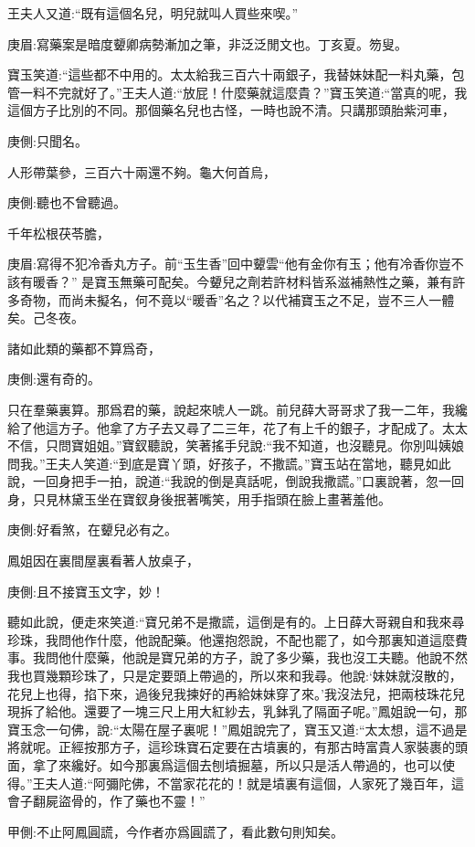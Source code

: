 \begin{parag}
    王夫人又道:“既有這個名兒，明兒就叫人買些來喫。”\begin{note}庚眉:寫藥案是暗度顰卿病勢漸加之筆，非泛泛閒文也。丁亥夏。笏叟。\end{note}寶玉笑道:“這些都不中用的。太太給我三百六十兩銀子，我替妹妹配一料丸藥，包管一料不完就好了。”王夫人道:“放屁！什麼藥就這麼貴？”寶玉笑道:“當真的呢，我這個方子比別的不同。那個藥名兒也古怪，一時也說不清。只講那頭胎紫河車，\begin{note}庚側:只聞名。\end{note}人形帶葉參，三百六十兩還不夠。龜大何首烏，\begin{note}庚側:聽也不曾聽過。\end{note}千年松根茯苓膽，\begin{note}庚眉:寫得不犯冷香丸方子。前“玉生香”回中顰雲“他有金你有玉；他有冷香你豈不該有暖香？” 是寶玉無藥可配矣。今顰兒之劑若許材料皆系滋補熱性之藥，兼有許多奇物，而尚未擬名，何不竟以“暖香”名之？以代補寶玉之不足，豈不三人一體矣。己冬夜。\end{note}諸如此類的藥都不算爲奇，\begin{note}庚側:還有奇的。\end{note}只在羣藥裏算。那爲君的藥，說起來唬人一跳。前兒薛大哥哥求了我一二年，我纔給了他這方子。他拿了方子去又尋了二三年，花了有上千的銀子，才配成了。太太不信，只問寶姐姐。”寶釵聽說，笑著搖手兒說:“我不知道，也沒聽見。你別叫姨娘問我。”王夫人笑道:“到底是寶丫頭，好孩子，不撒謊。”寶玉站在當地，聽見如此說，一回身把手一拍，說道:“我說的倒是真話呢，倒說我撒謊。”口裏說著，忽一回身，只見林黛玉坐在寶釵身後抿著嘴笑，用手指頭在臉上畫著羞他。\begin{note}庚側:好看煞，在顰兒必有之。\end{note}
\end{parag}


\begin{parag}
    鳳姐因在裏間屋裏看著人放桌子，\begin{note}庚側:且不接寶玉文字，妙！\end{note}聽如此說，便走來笑道:“寶兄弟不是撒謊，這倒是有的。上日薛大哥親自和我來尋珍珠，我問他作什麼，他說配藥。他還抱怨說，不配也罷了，如今那裏知道這麼費事。我問他什麼藥，他說是寶兄弟的方子，說了多少藥，我也沒工夫聽。他說不然我也買幾顆珍珠了，只是定要頭上帶過的，所以來和我尋。他說:‘妹妹就沒散的，花兒上也得，掐下來，過後兒我揀好的再給妹妹穿了來。’我沒法兒，把兩枝珠花兒現拆了給他。還要了一塊三尺上用大紅紗去，乳鉢乳了隔面子呢。”鳳姐說一句，那寶玉念一句佛，說:“太陽在屋子裏呢！”鳳姐說完了，寶玉又道:“太太想，這不過是將就呢。正經按那方子，這珍珠寶石定要在古墳裏的，有那古時富貴人家裝裹的頭面，拿了來纔好。如今那裏爲這個去刨墳掘墓，所以只是活人帶過的，也可以使得。”王夫人道:“阿彌陀佛，不當家花花的！就是墳裏有這個，人家死了幾百年，這會子翻屍盜骨的，作了藥也不靈！”\begin{note}甲側:不止阿鳳圓謊，今作者亦爲圓謊了，看此數句則知矣。\end{note}
\end{parag}


